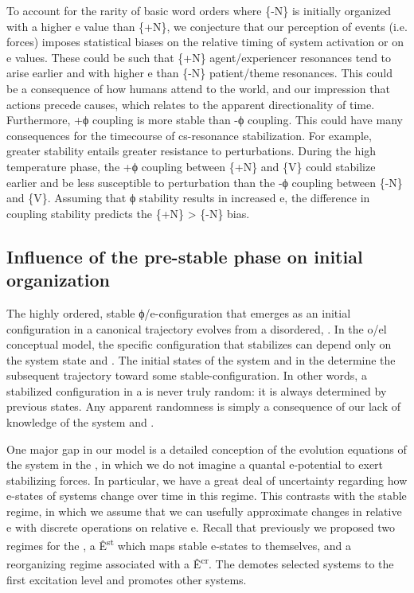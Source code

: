   To account for the rarity of basic word orders where \{-N\} is initially organized with a higher e value than \{+N\}, we conjecture that our perception of events (i.e.  forces) imposes statistical biases on the relative timing of system activation or on e values. These could be such that \{+N\} agent/experiencer resonances tend to arise earlier and with higher e than \{-N\} patient/theme resonances. This could be a consequence of how humans attend to the world, and our impression that actions precede causes, which relates to the apparent directionality of time. Furthermore, +ϕ coupling is more stable than -ϕ coupling. This could have many consequences for the timecourse of cs-resonance stabilization. For example, greater stability entails greater resistance to perturbations. During the high temperature phase, the +ϕ coupling between \{+N\} and \{V\} could stabilize earlier and be less susceptible to perturbation than the -ϕ coupling between \{-N\} and \{V\}. Assuming that ϕ stability results in increased e, the difference in coupling stability predicts the \{+N\} > \{-N\} bias.

\subsection{Influence of the pre-stable phase on initial organization}

The highly ordered, stable ϕ/e-configuration that emerges as an initial configuration in a canonical trajectory evolves from a disordered, . In the o/el conceptual model, the specific configuration that stabilizes can depend only on the system state and . The initial states of the system and  in the  determine the subsequent trajectory toward some stable-configuration. In other words, a stabilized configuration in a  is never truly random: it is always determined by previous states. Any apparent randomness is simply a consequence of our lack of knowledge of the system and .

  One major gap in our model is a detailed conception of the evolution equations of the system in the , in which we do not imagine a quantal e-potential to exert stabilizing forces. In particular, we have a great deal of uncertainty regarding how e-states of systems change over time in this regime. This contrasts with the stable regime, in which we assume that we can usefully approximate changes in relative e with discrete operations on relative e. Recall that previously we proposed two regimes for the , a  Ê\textsuperscript{st} which maps stable e-states to themselves, and a reorganizing regime associated with a  Ê\textsuperscript{cr}. The  demotes selected systems to the first excitation level and promotes other systems. 

